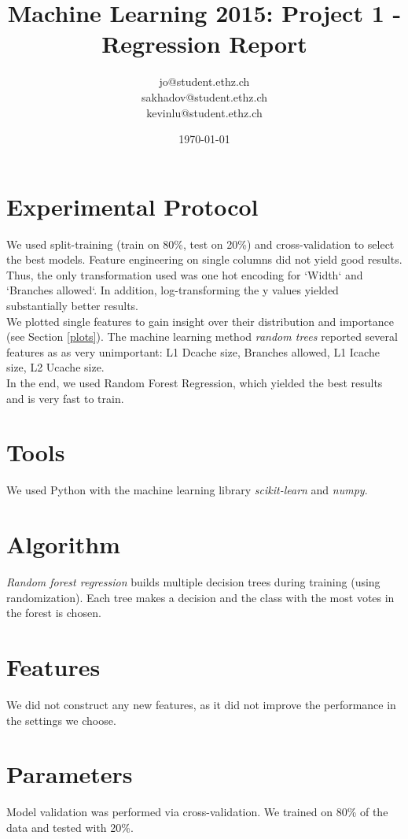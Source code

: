 \documentclass[a4paper, 11pt]{article}
\title{Machine Learning 2015: Project 1 - Regression Report}
\author{jo@student.ethz.ch\\ sakhadov@student.ethz.ch\\ kevinlu@student.ethz.ch\\}
\date{\today}
\begin{document}
\maketitle

\section*{Experimental Protocol}
We used split-training (train on 80\%, test on 20\%) and cross-validation to select the best models.
Feature engineering on single columns did not yield good results.
Thus, the only transformation used was one hot encoding for `Width` and `Branches allowed`. In addition, log-transforming the y values yielded substantially better results.\\
We plotted single features to gain insight over their distribution and importance (see Section \ref{plots}).
The machine learning method \textit{random trees} reported several features as as very unimportant: L1 Dcache size, Branches allowed, L1 Icache size, L2 Ucache size.\\
In the end, we used Random Forest Regression, which yielded the best results and is very fast to train.

\section{Tools}
We used Python with the machine learning library \textit{scikit-learn} and \textit{numpy}.

\section{Algorithm}
\textit{Random forest regression} builds multiple decision trees during training (using randomization). Each tree makes a decision and the class with the most votes in the forest is chosen.

\section{Features}
We did not construct any new features, as it did not improve the performance in the settings we choose.

\section{Parameters}
Model validation was performed via cross-validation. We trained on 80\% of the data and tested with 20\%.
\end{document}
